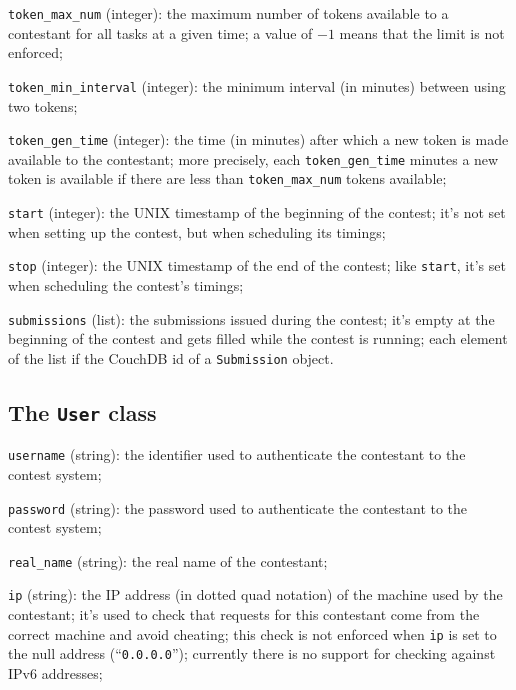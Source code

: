 \documentclass[a4paper,8pt]{amsart}
\newenvironment{squishlist}{%
  \begin{list}{\textbullet}%
    { \setlength{\itemsep}{0pt}%
      \setlength{\parsep}{3pt}%
      \setlength{\topsep}{3pt}%
      \setlength{\partopsep}{0pt}%
      \setlength{\leftmargin}{1.5em}%
      \setlength{\labelwidth}{1em}%
      \setlength{\labelsep}{0.5em} }%
}{\end{list}}
\newcommand{\id}[1]{\texttt{#1}}
\begin{document}
\begin{multicols}{2}
\begin{squishlist}
  \item \id{token\_max\_num} (integer): the maximum number of tokens
    available to a contestant for all tasks at a given time; a value
    of $-1$ means that the limit is not enforced;

  \item \id{token\_min\_interval} (integer): the minimum interval (in
    minutes) between using two tokens;

  \item \id{token\_gen\_time} (integer): the time (in minutes) after
    which a new token is made available to the contestant; more
    precisely, each \id{token\_gen\_time} minutes a new token is
    available if there are less than \id{token\_max\_num} tokens
    available;

  \item \id{start} (integer): the UNIX timestamp of the beginning
    of the contest; it's not set when setting up the contest, but when
    scheduling its timings;

  \item \id{stop} (integer): the UNIX timestamp of the end of the
    contest; like \id{start}, it's set when scheduling the contest's
    timings;

  \item \id{submissions} (list): the submissions issued during the
    contest; it's empty at the beginning of the contest and gets
    filled while the contest is running; each element of the list if
    the CouchDB id of a \id{Submission} object.

  \end{squishlist}

  \subsection{The \id{User} class}

  \begin{squishlist}

  \item \id{username} (string): the identifier used to authenticate
    the contestant to the contest system;

  \item \id{password} (string): the password used to authenticate the
    contestant to the contest system;

  \item \id{real\_name} (string): the real name of the contestant;

  \item \id{ip} (string): the IP address (in dotted quad notation) of
    the machine used by the contestant; it's used to check that
    requests for this contestant come from the correct machine and
    avoid cheating; this check is not enforced when \id{ip} is set to
    the null address (``\texttt{0.0.0.0}''); currently there is no
    support for checking against IPv6 addresses;


\end{squishlist}
\end{multicols}
\end{document}
